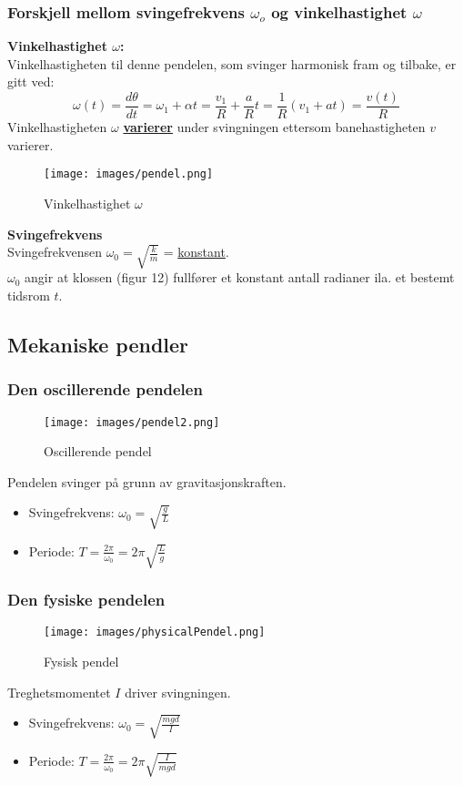 \documentclass[12pt]{article}
\begin{document}
\subsubsection{Forskjell mellom svingefrekvens $\omega_o$ og vinkelhastighet $\omega$}
\textbf{Vinkelhastighet $\omega$:}\\
Vinkelhastigheten til denne pendelen, som svinger harmonisk fram og tilbake, er gitt ved:
$$\omega(t) = \frac{d\theta}{dt} = \omega_1 + \alpha t = \frac{v_1}{R} + \frac{a}{R}t = \frac{1}{R}(v_1+at) = \frac{v(t)}{R}$$
Vinkelhastigheten $\omega$ \underline{\textbf{varierer}} under svingningen ettersom banehastigheten $v$ varierer.\\
\begin{figure} [H]
    \centering
    \texttt{[image: images/pendel.png]}
    \caption{Vinkelhastighet $\omega$}
\end{figure}
\bigskip
\textbf{Svingefrekvens}\\
Svingefrekvensen $\omega_0 = \sqrt{\frac{k}{m}}$ = \underline{konstant}.\\
$\omega_0$ angir at klossen (figur 12) fullfører et konstant antall radianer ila. et bestemt tidsrom $t$.

\subsection{Mekaniske pendler}
\subsubsection{Den oscillerende pendelen}
\begin{figure} [H]
    \centering
    \texttt{[image: images/pendel2.png]}
    \caption{Oscillerende pendel}
\end{figure}

Pendelen svinger på grunn av gravitasjonskraften.
\begin{itemize}
    \item[] Svingefrekvens: $\omega_0 = \sqrt{\frac{g}{L}}$
    \item[] Periode: $T = \frac{2\pi}{\omega_0} = 2\pi\sqrt{\frac{L}{g}}$
\end{itemize}

\subsubsection{Den fysiske pendelen}
\begin{figure} [H]
    \centering
    \texttt{[image: images/physicalPendel.png]}
    \caption{Fysisk pendel}
\end{figure}
Treghetsmomentet $I$ driver svingningen.
\begin{itemize}
    \item[] Svingefrekvens: $\omega_0 = \sqrt{\frac{mgd}{I}}$
    \item[] Periode: $T = \frac{2\pi}{\omega_0} = 2\pi\sqrt{\frac{I}{mgd}}$
\end{itemize}
\end{document}

